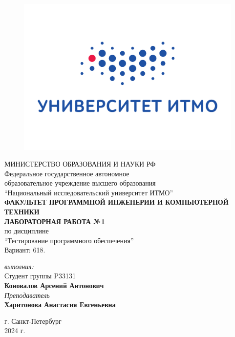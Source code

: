 \begin{center}

	\begin{figure}[H]
	\centering
	\includegraphics[scale=0.37]{img/logo.jpg}
	\end{figure}
	\hfill \break
	МИНИСТЕРСТВО ОБРАЗОВАНИЯ И НАУКИ РФ\\
	\hfill \break
	Федеральное государственное автономное\\
	образовательное учреждение высшего образования\\
	``Национальный исследовательский университет ИТМО''\\
	\hfill \break
	\textbf{ФАКУЛЬТЕТ ПРОГРАММНОЙ ИНЖЕНЕРИИ И КОМПЬЮТЕРНОЙ ТЕХНИКИ}\\
	\vspace{2cm}
	\large{\textbf{ЛАБОРАТОРНАЯ РАБОТА №1}}\\
	\hfill \break
	по дисциплине\\
	\large{``Тестирование программного обеспечения''}\\
	\hfill \break
	Вариант: 618.
	\vspace{3cm}
	\begin{flushright}
	\textit{выполнил:}\\
	Студент группы P33131\\
	\textbf{Коновалов Арсений Антонович}\\
	\textit{Преподаватель}\\
	\textbf{Харитонова Анастасия Евгеньевна}
	\end{flushright}
\end{center}

\vfill

\begin{center} г. Санкт-Петербург\\2024 г.
\end{center}

\thispagestyle{empty}
\newpage